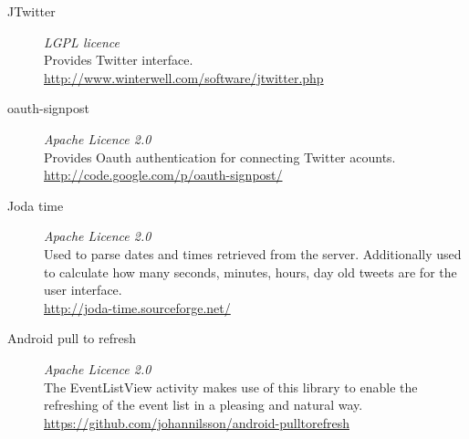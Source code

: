 \begin{description}
    \item[JTwitter] \emph{LGPL licence} \hfill \\
        Provides Twitter interface.\\
        \url{http://www.winterwell.com/software/jtwitter.php}
    \item[oauth-signpost] \emph{Apache Licence 2.0} \hfill \\
        Provides Oauth authentication for connecting Twitter acounts.\\
        \url{http://code.google.com/p/oauth-signpost/}
    \item[Joda time] \emph{Apache Licence 2.0} \hfill \\
        Used to parse dates and times retrieved from the server. Additionally
        used to calculate how many seconds, minutes, hours, day old tweets are
        for the user interface.\\
        \url{http://joda-time.sourceforge.net/}
    \item[Android pull to refresh] \emph{Apache Licence 2.0} \hfill \\
        The EventListView activity makes use of this library to enable the
        refreshing of the event list in a pleasing and natural way.\\
        \url{https://github.com/johannilsson/android-pulltorefresh}
\end{description}
